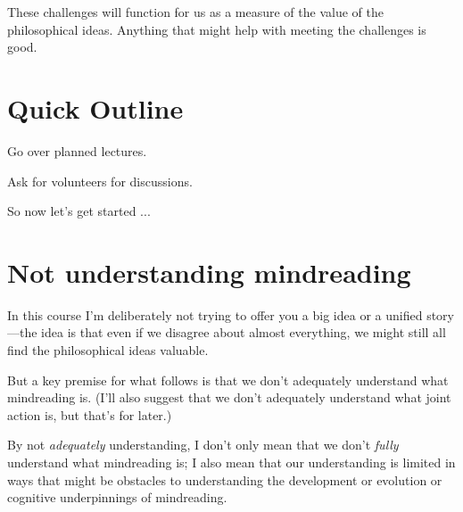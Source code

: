 \documentclass[12pt,\papersize]{extarticle}
\begin{document}
These challenges will function for us as a measure of the value of the philosophical ideas.
Anything that might help with meeting the challenges is good.

\section{Quick Outline}

Go over planned lectures.

Ask for volunteers for discussions.


So now let's get started ...



\section{Not understanding mindreading}
In this course I'm deliberately not trying to offer you a big idea or a unified story---the idea is that even if we disagree about almost everything, we might still all find the philosophical ideas valuable.

But a key premise for what follows is that we don't adequately understand what mindreading is.
(I'll also suggest that we don't adequately understand what joint action is, but that's for later.)

By not \emph{adequately} understanding, I don't only mean that we don't \emph{fully} understand what mindreading is;
I also mean that our understanding is limited in ways that might be obstacles to understanding the development or evolution or cognitive underpinnings of mindreading.

%
%
%
\end{document}
